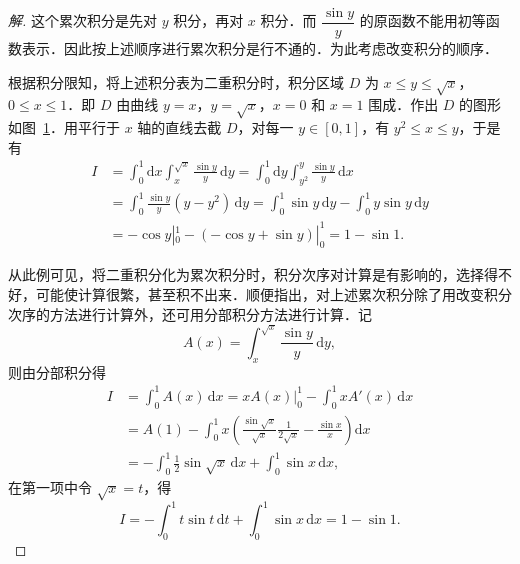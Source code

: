 \begin{proof}[解]
这个累次积分是先对 $y$ 积分，再对 $x$ 积分．而 $\dfrac{\sin y}{y}$ 的原函数不能用初等函数表示．因此按上述顺序进行累次积分是行不通的．为此考虑改变积分的顺序．

根据积分限知，将上述积分表为二重积分时，积分区域 $D$ 为 $x\leqslant y\leqslant\sqrt{x}$，$0\leqslant x\leqslant 1$．即 $D$ 由曲线 $y=x$，$y=\sqrt{x}$，$x=0$ 和 $x=1$ 围成．作出 $D$ 的图形如图~\ref{fig:20-12}．用平行于 $x$ 轴的直线去截 $D$，对每一 $y\in[0,1]$，有 $y^{2}\leqslant x\leqslant y$，于是有
\[
\begin{aligned}
I&=\int_{0}^{1}\mathrm{d}x\int_{x}^{\sqrt{x}}\frac{\sin y}{y}\,\mathrm{d}y=\int_{0}^{1}\mathrm{d}y\int_{y^{2}}^{y}\frac{\sin y}{y}\,\mathrm{d}x\\
&=\int_{0}^{1}\frac{\sin y}{y}(y-y^{2})\,\mathrm{d}y=\int_{0}^{1}\sin y\,\mathrm{d}y-\int_{0}^{1}y\sin y\,\mathrm{d}y\\
&=-\cos y\left|_{0}^{1}-(-\cos y+\sin y)\right|_{0}^{1}=1-\sin 1.
\end{aligned}
\]

\begin{figure}[htbp]
\centering
{}\caption{\relax}\label{fig:20-12}
\end{figure}

从此例可见，将二重积分化为累次积分时，积分次序对计算是有影响的，选择得不好，可能使计算很繁，甚至积不出来．顺便指出，对上述累次积分除了用改变积分次序的方法进行计算外，还可用分部积分方法进行计算．记
\[
A(x)=\int_{x}^{\sqrt{x}}\frac{\sin y}{y}\,\mathrm{d}y,
\]
则由分部积分得
\[
\begin{aligned}
I&=\int_{0}^{1}A(x)\,\mathrm{d}x=xA(x)\bigg|_{0}^{1}-\int_{0}^{1}xA'(x)\,\mathrm{d}x\\
&=A(1)-\int_{0}^{1}x\left(\frac{\sin\sqrt{x}}{\sqrt{x}}\frac{1}{2\sqrt{x}}-\frac{\sin x}{x}\right)\mathrm{d}x\\
&=-\int_{0}^{1}\frac{1}{2}\sin\sqrt{x}\,\mathrm{d}x+\int_{0}^{1}\sin x\,\mathrm{d}x,
\end{aligned}
\]
在第一项中令 $\sqrt{x}=t$，得
\[
I=-\int_{0}^{1}t\sin t\,\mathrm{d}t+\int_{0}^{1}\sin x\,\mathrm{d}x=1-\sin 1.
\]
\end{proof}

